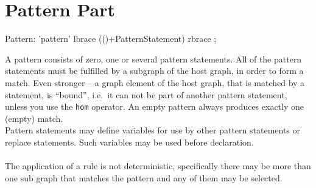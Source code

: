 \section{Pattern Part}
\label{patternpart}
\begin{rail}
  Pattern: 'pattern' lbrace (()+PatternStatement) rbrace ;
\end{rail}
A pattern consists of zero, one or several pattern statements. All of the pattern statements must be fulfilled by a subgraph of the host graph, in order to form a match. Even stronger -- a graph element of the host graph, that is matched by a statement, is ``bound'', i.e.\ it can not be part of another pattern statement, unless you use the \texttt{hom} operator. An empty pattern always produces exactly one (empty) match.\\
Pattern statements may define variables for use by other pattern statements or replace statements. Such variables may be used before declaration.\\
 {\small \\ The application of a rule is not deterministic, specifically there may be more than one sub graph that matches the pattern and any of them may be selected.\\}

